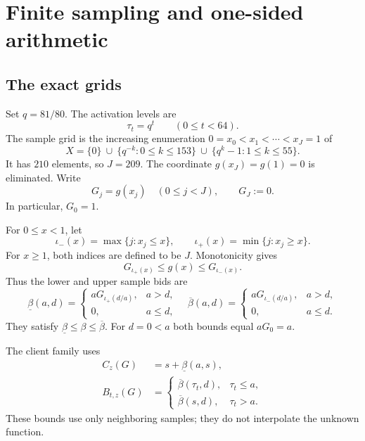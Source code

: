 \documentclass[11pt]{article}
\numberwithin{equation}{section}
\theoremstyle{definition}
\begin{document}
\section{Finite sampling and one-sided arithmetic}\label{sec:rounding}

\subsection{The exact grids}
Set $q=81/80$. The activation levels are
\begin{equation}\label{eq:timegrid}
 \tau_t=q^t\qquad(0\le t<64).
\end{equation}
The sample grid is the increasing enumeration
$0=x_0<x_1<\cdots<x_J=1$ of
\begin{equation}\label{eq:samplegrid}
 X=\{0\}\ \cup\ \{q^{-k}:0\le k\le153\}
       \ \cup\ \{q^k-1:1\le k\le55\}.
\end{equation}
It has $210$ elements, so $J=209$. The coordinate $g(x_J)=g(1)=0$ is
eliminated. Write
\[
 G_j=g(x_j)\quad(0\le j<J),\qquad G_J:=0.
\]
In particular, $G_0=1$.

For $0\le x<1$, let
\[
 \iota_-(x)=\max\{j:x_j\le x\},\qquad
 \iota_+(x)=\min\{j:x_j\ge x\}.
\]
For $x\ge1$, both indices are defined to be $J$. Monotonicity gives
\begin{equation}\label{eq:sample-sandwich}
 G_{\iota_+(x)}\le g(x)\le G_{\iota_-(x)}.
\end{equation}
Thus the lower and upper sample bids are
\begin{equation}\label{eq:sample-bid}
 \underline\beta(a,d)=
 \begin{cases}aG_{\iota_+(d/a)},&a>d,\\0,&a\le d,\end{cases}
 \quad
 \overline\beta(a,d)=
 \begin{cases}aG_{\iota_-(d/a)},&a>d,\\0,&a\le d.\end{cases}
\end{equation}
They satisfy $\underline\beta\le\beta\le\overline\beta$.
For $d=0<a$ both bounds equal $aG_0=a$.

The client family uses
\begin{align}
 C_z(G)&=s+\underline\beta(a,s),\label{eq:roundedC}\\
 B_{t,z}(G)&=
 \begin{cases}
  \overline\beta(\tau_t,d),&\tau_t\le a,\\
  \overline\beta(s,d),&\tau_t>a.
 \end{cases}\label{eq:roundedB}
\end{align}
These bounds use only neighboring samples; they do not interpolate the
unknown function.
\end{document}
